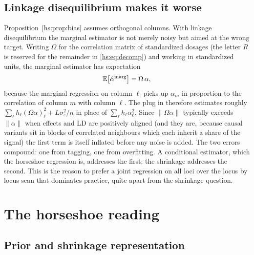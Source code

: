 \subsection{Linkage disequilibrium makes it worse}

Proposition~\ref{hs:prop:bias} assumes orthogonal columns. With linkage disequilibrium the marginal estimator is not merely noisy but aimed at the wrong target. Writing $\Omega$ for the correlation matrix of standardized dosages (the letter $R$ is reserved for the remainder in \eqref{hs:eq:decomp}) and working in standardized units, the marginal estimator has expectation
\[
\mathbb{E}\big[\hat\alpha^{\rm marg}\big] = \Omega\,\alpha ,
\]
because the marginal regression on column $\ell$ picks up $\alpha_m$ in proportion to the correlation of column $m$ with column $\ell$. The plug in therefore estimates roughly $\sum_\ell h_\ell (\Omega\alpha)_\ell^2 + L\sigma^2_\varepsilon/n$ in place of $\sum_\ell h_\ell \alpha_\ell^2$. Since $\|\Omega\alpha\|$ typically exceeds $\|\alpha\|$ when effects and LD are positively aligned (and they are, because causal variants sit in blocks of correlated neighbours which each inherit a share of the signal) the first term is itself inflated before any noise is added. The two errors compound: one from tagging, one from overfitting. A conditional estimator, which the horseshoe regression is, addresses the first; the shrinkage addresses the second. This is the reason to prefer a joint regression on all loci over the locus by locus scan that dominates practice, quite apart from the shrinkage question.

\section{The horseshoe reading}
\label{hs:sec:hs}

\subsection{Prior and shrinkage representation}

